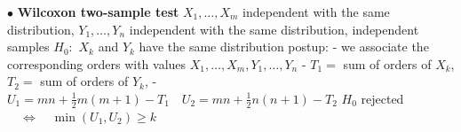 \documentclass[twoside]{book}
\begin{document}
\pagestyle{empty}

\def\dr #1{\par\noindent $\bullet$ {\bf #1}}

\dr{Wilcoxon two-sample test}
\vspace*{2mm}
\newline $X_1,\dots,X_m$ independent with the same distribution, $Y_1,\dots,Y_n$ independent with the same distribution, independent samples
\newline $H_0:$ $X_k$ and $Y_k$ have the same distribution
\newline
postup:
\newline - we associate the corresponding orders with values $X_1,\dots, X_m, Y_1,\dots,Y_n$ 
\newline - $T_1=$ sum of orders of $X_k$, $T_2=$ sum of orders of  $Y_k$,
\newline - $ U_1=mn+\frac12m(m+1) -T_1 \quad  U_2=mn+\frac12n(n+1) -T_2 $
\newline $H_0$  rejected $\quad \Longleftrightarrow \quad \min(U_1,U_2) \geq k$
\end{document}
